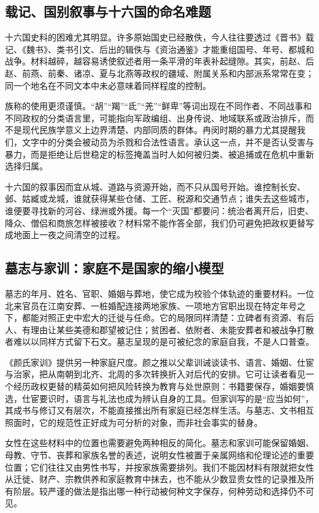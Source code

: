 \subsection{载记、国别叙事与十六国的命名难题}

十六国史料的困难尤其明显。许多原始国史已经散佚，今人往往要透过《晋书》载记、《魏书》、类书引文、后出的辑佚与《资治通鉴》才能重组国号、年号、都城和战争。材料越碎，越容易诱使叙述者用一条平滑的年表补起缝隙。其实，前赵、后赵、前燕、前秦、诸凉、夏与北燕等政权的疆域、附属关系和内部派系常常在变；同一个地名在不同文本中未必意味着同样程度的控制。

族称的使用更须谨慎。“胡”“羯”“氐”“羌”“鲜卑”等词出现在不同作者、不同战事和不同政权的分类语言里，可能指向军政编组、出身传说、地域联系或政治排斥，而不是现代民族学意义上边界清楚、内部同质的群体。冉闵时期的暴力尤其提醒我们，文字中的分类会被动员为杀戮和合法性语言。承认这一点，并不是否认受害与暴力，而是拒绝让后世稳定的标签掩盖当时人如何被归类、被追捕或在危机中重新选择归属。

十六国的叙事因而宜从城、道路与资源开始，而不只从国号开始。谁控制长安、邺、姑臧或龙城，谁就获得某些仓储、工匠、税源和交通节点；谁失去这些城市，谁便要寻找新的河谷、绿洲或外援。每一个“灭国”都要问：统治者离开后，旧吏、降众、僧侣和商旅怎样被接收？材料常不能作答全部，我们仍可避免把政权更替写成地面上一夜之间清空的过程。

\subsection{墓志与家训：家庭不是国家的缩小模型}

墓志的年月、姓名、官职、婚姻与葬地，使它成为校验个体轨迹的重要材料。一位北来官员在江南安葬、一桩婚配连接两地家族、一项地方官职出现在特定年号之下，都能对照正史中宏大的迁徙与任命。它的局限同样清楚：立碑者有资源、有后人、有理由让某些美德和郡望被记住；贫困者、依附者、未能安葬者和被战争打散者难以以同样方式留下石文。墓志呈现的是可被纪念的家庭自我，不是人口普查。

《颜氏家训》提供另一种家庭尺度。颜之推以父辈训诫谈读书、语言、婚姻、仕宦与治家，把从南朝到北齐、北周的多次转换折入对后代的安排。它可让读者看见一个经历政权更替的精英如何把风险转换为教育与处世原则：书籍要保存，婚姻要慎选，仕宦要识时，语言与礼法也成为辨认自身的工具。但家训写的是“应当如何”，其成书与修订又有层次，不能直接推出所有家庭已经怎样生活。与墓志、文书相互照面时，它的规范性正好成为可分析的对象，而非社会事实的替身。

女性在这些材料中的位置也需要避免两种相反的简化。墓志和家训可能保留婚姻、母教、守节、丧葬和家族名誉的表述，说明女性被置于亲属网络和伦理论述的重要位置；它们往往又由男性书写，并按家族需要排列。我们不能因材料有限就把女性从迁徙、财产、宗教供养和家庭教育中抹去，也不能从少数显贵女性的记录推及所有阶层。较严谨的做法是指出哪一种行动被何种文字保存，何种劳动和选择仍不可见。

